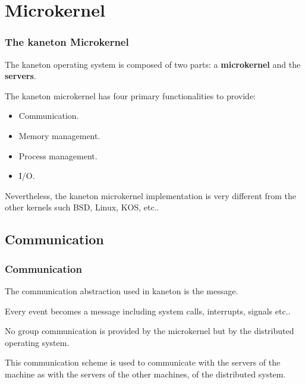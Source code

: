 {%
%

\section{Microkernel}


\begin{frame}
  \frametitle{The kaneton Microkernel}

  The kaneton operating system is composed of two parts: a
  \textbf{microkernel} and the \textbf{servers}.

  \nl

  The kaneton microkernel has four primary functionalities
  to provide:

  \begin{itemize}[<+->]
    \item
      Communication.
    \item
      Memory management.
    \item
      Process management.
    \item
      I/O.
  \end{itemize}

  \nl

  Nevertheless, the kaneton microkernel implementation is very different
  from the other kernels such BSD, Linux, KOS, etc..
\end{frame}

%
%

\subsection{Communication}


\begin{frame}
  \frametitle{Communication}

  The communication abstraction used in kaneton is the message.

  \nl

  Every event becomes a message including system calls, interrupts,
  signals etc..

  \nl

  No group communication is provided by the microkernel but by the distributed
  operating system.

  \nl

  This communication scheme is used to communicate with the servers
  of the machine as with the servers of the other machines, of
  the distributed system.


\end{frame}}
